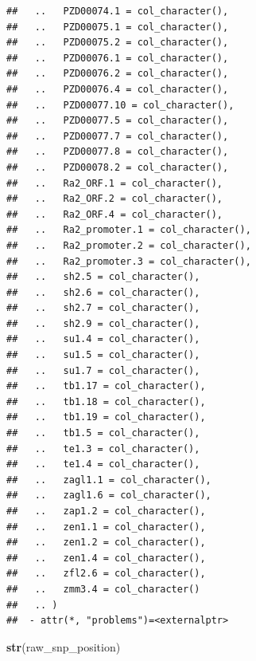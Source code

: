 \documentclass[
]{article}
\newenvironment{Shaded}{\begin{snugshade}}{\end{snugshade}}
\newcommand{\FunctionTok}[1]{\textcolor[rgb]{0.13,0.29,0.53}{\textbf{#1}}}
\newcommand{\NormalTok}[1]{#1}
\begin{document}
\begin{verbatim}
##   ..   PZD00074.1 = col_character(),
##   ..   PZD00075.1 = col_character(),
##   ..   PZD00075.2 = col_character(),
##   ..   PZD00076.1 = col_character(),
##   ..   PZD00076.2 = col_character(),
##   ..   PZD00076.4 = col_character(),
##   ..   PZD00077.10 = col_character(),
##   ..   PZD00077.5 = col_character(),
##   ..   PZD00077.7 = col_character(),
##   ..   PZD00077.8 = col_character(),
##   ..   PZD00078.2 = col_character(),
##   ..   Ra2_ORF.1 = col_character(),
##   ..   Ra2_ORF.2 = col_character(),
##   ..   Ra2_ORF.4 = col_character(),
##   ..   Ra2_promoter.1 = col_character(),
##   ..   Ra2_promoter.2 = col_character(),
##   ..   Ra2_promoter.3 = col_character(),
##   ..   sh2.5 = col_character(),
##   ..   sh2.6 = col_character(),
##   ..   sh2.7 = col_character(),
##   ..   sh2.9 = col_character(),
##   ..   su1.4 = col_character(),
##   ..   su1.5 = col_character(),
##   ..   su1.7 = col_character(),
##   ..   tb1.17 = col_character(),
##   ..   tb1.18 = col_character(),
##   ..   tb1.19 = col_character(),
##   ..   tb1.5 = col_character(),
##   ..   te1.3 = col_character(),
##   ..   te1.4 = col_character(),
##   ..   zagl1.1 = col_character(),
##   ..   zagl1.6 = col_character(),
##   ..   zap1.2 = col_character(),
##   ..   zen1.1 = col_character(),
##   ..   zen1.2 = col_character(),
##   ..   zen1.4 = col_character(),
##   ..   zfl2.6 = col_character(),
##   ..   zmm3.4 = col_character()
##   .. )
##  - attr(*, "problems")=<externalptr>
\end{verbatim}

\begin{Shaded}
\begin{Highlighting}[]
\FunctionTok{str}\NormalTok{(raw\_snp\_position)}
\end{Highlighting}
\end{Shaded}
\end{document}
